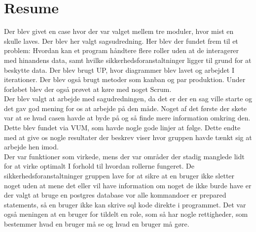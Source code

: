 \chapter{Resume}
Der blev givet en case hvor der var valget mellem tre moduler, hvor mist en skulle laves. Der blev her valgt sagsudredning. Her blev der fundet frem til et problem: Hvordan kan et program håndtere flere roller uden at de interagerer med hinandens data, samt hvilke sikkerhedsforanstaltninger ligger til grund for at beskytte data. Der blev brugt UP, hvor diagrammer blev lavet og arbejdet I iterationer. Der blev også brugt metoder som kanban og par produktion. Under forløbet blev der også prøvet at køre med noget Scrum. \\
Der blev valgt at arbejde med sagudredningen, da det er der en sag ville starte og det gav god mening for os at arbejde på den måde. Noget af det første der skete var at se hvad casen havde at byde på og så finde mere information omkring den. Dette blev fundet via VUM, som havde nogle gode linjer at følge. Dette endte med at give os nogle resultater der beskrev viser hvor gruppen havde tænkt sig at arbejde hen imod. \\
Der var funktioner som virkede, mens der var områder der stadig manglede lidt for at virke optimalt I forhold til hvordan rollerne fungeret. De sikkerhedsforanstaltninger gruppen lave for at sikre at en bruger ikke sletter noget uden at mene det eller vil have information om noget de ikke burde have er der valgt at bruge en postgres database vor alle kommandoer er prepared statements, så en bruger ikke kan skrive sql kode direkte i programmet. Det var også meningen at en bruger for tildelt en role, som så har nogle rettigheder, som bestemmer hvad en bruger må se og hvad en bruger må gøre.  \\